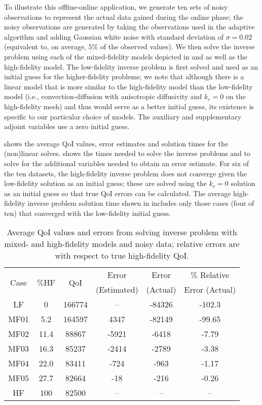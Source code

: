 To illustrate this offline-online application, we generate ten sets of noisy observations to represent the actual data gained during the online phase; the noisy observations are generated by taking the observations used in the adaptive algorithm and adding Gaussian white noise with standard deviation of $\sigma=0.02$ (equivalent to, on average, $5\%$ of the observed values). We then solve the inverse problem using each of the mixed-fidelity models depicted in  and  as well as the high-fidelity model. The low-fidelity inverse problem is first solved and used as an initial guess for the higher-fidelity problems; we note that although there is a linear model that is more similar to the high-fidelity model than the low-fidelity model (i.e., convection-diffusion with anisotropic diffusivity and $k_r=0$ on the high-fidelity mesh) and thus would serve as a better initial guess, its existence is specific to our particular choice of models. The auxiliary and supplementary adjoint variables use a zero initial guess.

 shows the average QoI values, error estimates and solution times for the (non)linear solves.  shows the times needed to solve the inverse problems and to solve for the additional variables needed to obtain an error estimate. For six of the ten datasets, the high-fidelity inverse problem does not converge given the low-fidelity solution as an initial guess; these are solved using the $k_r=0$ solution as an initial guess so that true QoI errors can be calculated. The average high-fidelity inverse problem solution time shown in  includes only those cases (four of ten) that converged with the low-fidelity initial guess.
%
\begin{table}
\centering
\begin{tabular}{|c|c|c|c|c|c|}
\hline
\multirow{2}{*}{Case} & \multirow{2}{*}{$\%$HF} & \multirow{2}{*}{QoI} & Error & Error & $\%$ Relative  \\
& & & (Estimated) & (Actual) & Error (Actual) \\ \hline
LF   & 0    & 166774 & --    & -84326 & -102.3 \\
MF01 & 5.2  & 164597 & 4347  & -82149 & -99.65  \\
MF02 & 11.4 & 88867  & -5921 & -6418  & -7.79  \\
MF03 & 16.3 & 85237  & -2414 & -2789  & -3.38  \\
MF04 & 22.0 & 83411  & -724  & -963   & -1.17  \\
MF05 & 27.7 & 82664  & -18   & -216   & -0.26 \\
HF   & 100  & 82500  & --    & --     & --  \\ \hline
\end{tabular}
\caption{Average QoI values and errors from solving inverse problem with mixed- and high-fidelity models and noisy data; relative errors are with respect to true high-fidelity QoI.}
\label{tab:ref3D_newdata_QoI_diffmesh}
\end{table}

